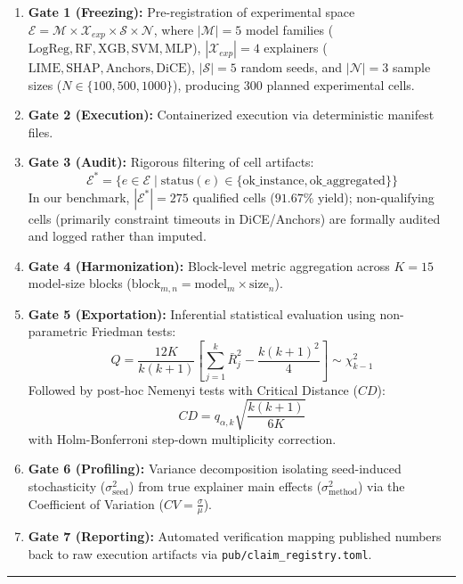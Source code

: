 \documentclass[
]{article}
\providecommand{\tightlist}{%
  \setlength{\itemsep}{0pt}\setlength{\parskip}{0pt}}
\begin{document}
\begin{enumerate}
\def\labelenumi{\arabic{enumi}.}
\tightlist
\item
  \textbf{Gate 1 (Freezing):} Pre-registration of experimental space
  \(\mathcal{E} = \mathcal{M} \times \mathcal{X}_{exp} \times \mathcal{S} \times \mathcal{N}\),
  where \(|\mathcal{M}|=5\) model families
  (\(\text{LogReg}, \text{RF}, \text{XGB}, \text{SVM}, \text{MLP}\)),
  \(|\mathcal{X}_{exp}|=4\) explainers
  (\(\text{LIME}, \text{SHAP}, \text{Anchors}, \text{DiCE}\)),
  \(|\mathcal{S}|=5\) random seeds, and \(|\mathcal{N}|=3\) sample sizes
  (\(N \in \{100, 500, 1000\}\)), producing 300 planned experimental
  cells.
\item
  \textbf{Gate 2 (Execution):} Containerized execution via deterministic
  manifest files.
\item
  \textbf{Gate 3 (Audit):} Rigorous filtering of cell artifacts:
  \[\mathcal{E}^* = \{ e \in \mathcal{E} \mid \text{status}(e) \in \{\text{ok\_instance}, \text{ok\_aggregated}\} \}\]
  In our benchmark, \(|\mathcal{E}^*| = 275\) qualified cells
  (\(91.67\%\) yield); non-qualifying cells (primarily constraint
  timeouts in DiCE/Anchors) are formally audited and logged rather than
  imputed.
\item
  \textbf{Gate 4 (Harmonization):} Block-level metric aggregation across
  \(K=15\) model-size blocks
  (\(\text{block}_{m, n} = \text{model}_m \times \text{size}_n\)).
\item
  \textbf{Gate 5 (Exportation):} Inferential statistical evaluation
  using non-parametric Friedman tests:
  \[Q = \frac{12 K}{k(k+1)} \left[ \sum_{j=1}^k \bar{R}_j^2 - \frac{k(k+1)^2}{4} \right] \sim \chi^2_{k-1}\]
  Followed by post-hoc Nemenyi tests with Critical Distance (\(CD\)):
  \[CD = q_{\alpha, k} \sqrt{\frac{k(k+1)}{6K}}\] with Holm-Bonferroni
  step-down multiplicity correction.
\item
  \textbf{Gate 6 (Profiling):} Variance decomposition isolating
  seed-induced stochasticity (\(\sigma^2_{\text{seed}}\)) from true
  explainer main effects (\(\sigma^2_{\text{method}}\)) via the
  Coefficient of Variation (\(CV = \frac{\sigma}{\mu}\)).
\item
  \textbf{Gate 7 (Reporting):} Automated verification mapping published
  numbers back to raw execution artifacts via
  \texttt{pub/claim\_registry.toml}.
\end{enumerate}

\begin{center}\rule{0.5\linewidth}{0.5pt}\end{center}
\end{document}
